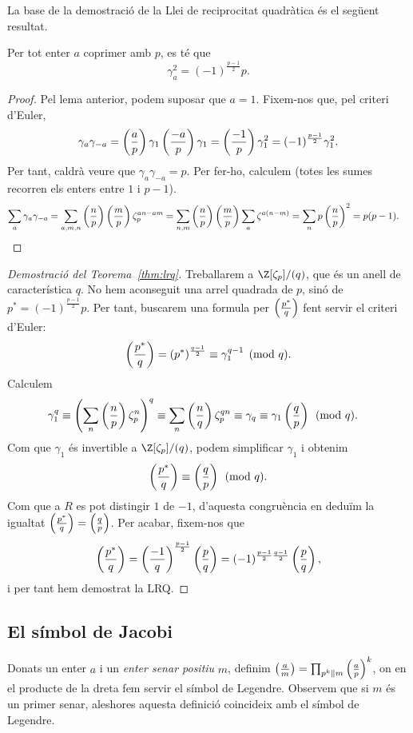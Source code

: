La base de la demostració de la Llei de reciprocitat quadràtica és el següent resultat.
\begin{proposition}
Per tot enter $a$ coprimer amb $p$, es té que
 \[
 \gamma_a^2 = (-1)^{\frac{p-1}{2}} p.
 \]
\end{proposition}
\begin{proof}
 Pel lema anterior, podem suposar que $a=1$. Fixem-nos que, pel criteri d'Euler,
 \[
 \gamma_a\gamma_{-a}=\left(\frac{a}{p}\right)\gamma_1\left(\frac{-a}{p}\right)\gamma_1=\left(\frac{-1}{p}\right)\gamma_1^2 = (-1)^{\frac{p-1}{2}} \gamma_1^2.
 \]
 Per tant, caldrà veure que $\gamma_a\gamma_{-a} = p$. Per fer-ho, calculem (totes les sumes recorren els enters entre $1$ i $p-1$).
 \begin{align*}
     \sum_a \gamma_a\gamma_{-a} &= \sum_{a,m,n} \left(\frac{n}{p}\right)\left(\frac{m}{p}\right)\zeta_p^{an-am}=\sum_{n,m} \left(\frac{n}{p}\right) \left(\frac{m}{p}\right) \sum_{a} \zeta^{a(n-m)} = \sum_n p \left(\frac{n}{p}\right)^2 = p(p-1).
 \end{align*}
\end{proof}

\begin{proof}[Demostració del Teorema~\ref{thm:lrq}]
Treballarem a $\Z[\zeta_p]/(q)$, que és un anell de característica $q$. No hem aconseguit una arrel quadrada de $p$, sinó de $p^*=(-1)^{\frac{p-1}2} p$. Per tant, buscarem una formula per $\left(\frac{p^*}{q}\right)$ fent servir el  criteri d'Euler:
\[
\left(\frac{p^*}{q}\right)= (p^*)^{\frac{q-1}{2}} \equiv \gamma_1^{q-1}\pmod{q}.
\]
Calculem
\begin{align*}
\gamma_1^q &\equiv \left(\sum_n \left(\frac{n}{p}\right)\zeta_p^n\right)^q \equiv \sum_n \left(\frac{n}{q}\right) \zeta_p^{qn} \equiv \gamma_q\equiv \gamma_1\left(\frac{q}{p}\right)\pmod{q}.
\end{align*}
Com que $\gamma_1$ és invertible a $\Z[\zeta_p]/(q)$, podem simplificar $\gamma_1$ i obtenim
\[
\left(\frac{p^*}{q}\right)\equiv \left(\frac{q}{p}\right)\pmod q.
\]
Com que a $R$ es pot distingir $1$ de $-1$, d'aquesta congruència en deduïm la igualtat $\left(\frac{p^*}{q}\right)=\left(\frac{q}{p}\right)$.
Per acabar, fixem-nos que
\[
\left(\frac{p^*}{q}\right) = \left(\frac{-1}{q}\right)^{\frac{p-1}{2}} \left(\frac{p}{q}\right) = (-1)^{\frac{p-1}{2}\frac{q-1}{2}} \left(\frac{p}{q}\right),
\]
i per tant hem demostrat la LRQ.
\end{proof}

\subsection{El símbol de Jacobi}
Donats un enter $a$ i un \emph{enter senar positiu} $m$, definim $\left(\frac{a}{m}\right)=\prod_{p^k\parallel m} \left(\frac{a}{p}\right)^k$,
on en el producte de la dreta fem servir el símbol de Legendre. Observem que si $m$ és un primer senar, aleshores aquesta definició coincideix amb el símbol de Legendre.

